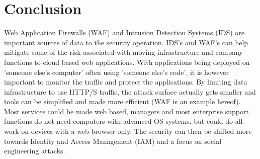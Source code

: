\documentclass[
	letterpaper, %
	10pt, %
	unnumberedsections, %
	twoside, %
]{APAAssignment}
\begin{document}
\section{Conclusion}
Web Application Firewalls (WAF) and Intrusion Detection Systems (IDS) are important sources of data to the security operation. IDS's and WAF's can help mitigate some of the risk associated with moving infrastructure and company functions to cloud based web applications. With applications being deployed on 'someone else's computer' often using 'someone else's code', it is however important to monitor the traffic and protect the applications. By limiting data infrastructure to use  HTTP/S traffic, the attack surface actually gets smaller and tools can be simplified and made more efficient (WAF is an example hereof). Most services could be made web based, managers and most enterprise support functions do not need computers with advanced OS systems, but could do all work on devices with a web browser only. The security can then be shifted more towards Identity and Access Management (IAM) and a focus on social engineering attacks.


\clearpage
\printbibliography %





\appendix


\clearpage
\end{document}

